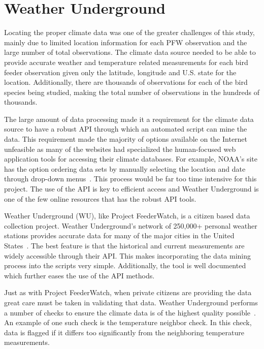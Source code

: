 \section{Weather Underground}

Locating the proper climate data was one of the greater challenges of this study, mainly due to limited location information for each PFW observation and the large number of total observations. The climate data source needed to be able to provide accurate weather and temperature related measurements for each bird feeder observation given only the latitude, longitude and U.S. state for the location. Additionally, there are thousands of observations for each of the bird species being studied, making the total number of observations in the hundreds of thousands. 

The large amount of data processing made it a requirement for the climate data source to have a robust API through which an automated script can mine the data. This requirement made the majority of options available on the Internet unfeasible as many of the websites had specialized the human-focused web application tools for accessing their climate databases. For example, NOAA's site has the option ordering data sets by manually selecting the location and date through drop-down menus~\cite{NOAAData:online}. This process would be far too time intensive for this project. The use of the API is key to efficient access and Weather Underground is one of the few online resources that has the robust API tools.

Weather Underground (WU), like Project FeederWatch, is a citizen based data collection project. Weather Underground's network of 250,000+ personal weather stations provides accurate data for many of the major cities in the United States~\cite{WUData:online}. The best feature is that the historical and current measurements are widely accessible through their API. This makes incorporating the data mining process into the scripts very simple. Additionally, the tool is well documented which further eases the use of the API methods.

Just as with Project FeederWatch, when private citizens are providing the data great care must be taken in validating that data. Weather Underground performs a number of checks to ensure the climate data is of the highest quality possible~\cite{WUQuality:online}. An example of one such check is the temperature neighbor check. In this check, data is flagged if it differs too significantly from the neighboring temperature measurements. 

